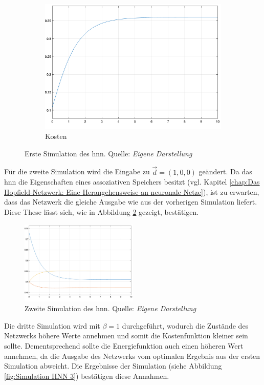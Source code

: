 \begin{figure}[h]
\begin{subfigure}[b]{0.32\textwidth}
    \includegraphics[width=\textwidth]{abbildungen/hnn_simulation_1_kostenfunktion.png}
    \caption{Kosten}
  \end{subfigure}
  \caption{Erste Simulation des \ac{hnn}. Quelle: \textit{Eigene Darstellung}}
  \label{fig:Simulation HNN 1}
\end{figure}

Für die zweite Simulation wird die Eingabe zu \(\vec{d}=(1,0,0)\) geändert. Da das \ac{hnn} die Eigenschaften eines assoziativen Speichers besitzt (vgl. Kapitel \ref{chap:Das Hopfield-Netzwerk: Eine Herangehensweise an neuronale Netze}), ist zu erwarten, dass das Netzwerk die gleiche Ausgabe wie aus der vorherigen Simulation liefert. Diese These lässt sich, wie in Abbildung \ref{fig:Simulation HNN 2} gezeigt, bestätigen.

\begin{figure}[h]
  \centering
  \includegraphics[width=0.5\textwidth]{abbildungen/hnn_simulation_2_ausgabe.png}
  \caption{Zweite Simulation des \ac{hnn}. Quelle: \textit{Eigene Darstellung}}
  \label{fig:Simulation HNN 2}
\end{figure}

Die dritte Simulation wird mit \(\beta=1\) durchgeführt, wodurch die Zustände des Netzwerks höhere Werte annehmen und somit die Kostenfunktion kleiner sein sollte. Dementsprechend sollte die Energiefunktion auch einen höheren Wert annehmen, da die Ausgabe des Netzwerks vom optimalen Ergebnis aus der ersten Simulation abweicht. Die Ergebnisse der Simulation (siehe Abbildung \ref{fig:Simulation HNN 3}) bestätigen diese Annahmen.

